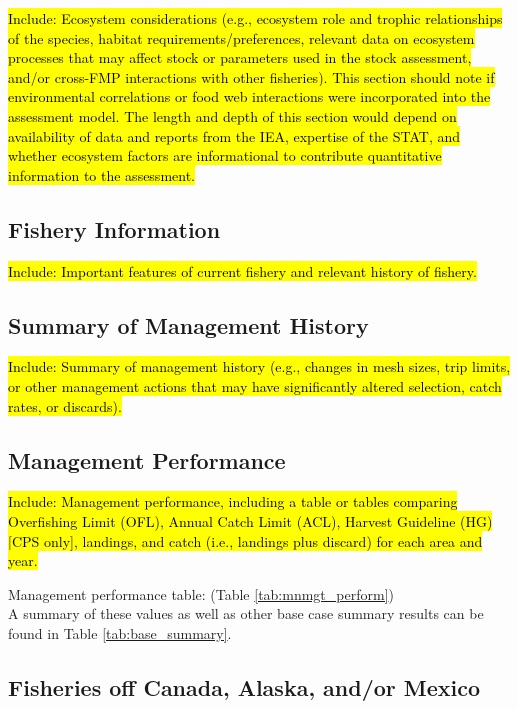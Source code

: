 \documentclass[12pt,]{article}
\begin{document}
\hl{Include: Ecosystem considerations (e.g., ecosystem role and trophic relationships of  the species, habitat requirements/preferences, relevant data on ecosystem processes  that may affect stock or parameters used in the stock assessment, and/or cross-FMP  interactions with other fisheries). This section should note if environmental  correlations or food web interactions were incorporated into the assessment model.  The length and depth of this section would depend on availability of data and reports  from the IEA, expertise of the STAT, and whether ecosystem factors are informational  to contribute quantitative information to the assessment.}

\subsection{Fishery Information}\label{fishery-information}

\hl{Include: Important features of current fishery and relevant history of fishery.}

\subsection{Summary of Management
History}\label{summary-of-management-history}

\hl{Include: Summary of management history (e.g., changes in mesh sizes, trip 
limits, or other management actions that may have significantly altered selection, 
catch rates, or discards).}

\subsection{Management Performance}\label{management-performance-1}

\hl{Include: Management performance, including a table or tables comparing 
Overfishing Limit (OFL), Annual Catch Limit (ACL), Harvest Guideline (HG) 
[CPS only], landings, and catch (i.e., landings plus discard) for each area and year.}

Management performance table: (Table \ref{tab:mnmgt_perform})\\
A summary of these values as well as other base case summary results can
be found in Table \ref{tab:base_summary}.

\subsection{Fisheries off Canada, Alaska, and/or
Mexico}\label{fisheries-off-canada-alaska-andor-mexico}
\end{document}
